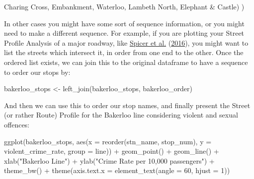 \documentclass[
  krantz2]{krantz}
\makeatletter
\newenvironment{Shaded}{\begin{snugshade}}{\end{snugshade}}
\newcommand{\AttributeTok}[1]{\textcolor[rgb]{0.61,0.61,0.61}{#1}}
\newcommand{\DecValTok}[1]{\textcolor[rgb]{0.06,0.06,0.06}{#1}}
\newcommand{\FunctionTok}[1]{\textcolor[rgb]{0,0,0}{#1}}
\newcommand{\NormalTok}[1]{#1}
\newcommand{\OtherTok}[1]{\textcolor[rgb]{0.37,0.37,0.37}{#1}}
\newcommand{\SpecialCharTok}[1]{\textcolor[rgb]{0,0,0}{#1}}
\newcommand{\StringTok}[1]{\textcolor[rgb]{0.5,0.5,0.5}{#1}}
\newenvironment{kframe}{%
\medskip{}
\setlength{\fboxsep}{.8em}
 \def\at@end@of@kframe{}%
 \ifinner\ifhmode%
  \def\at@end@of@kframe{\end{minipage}}%
  \begin{minipage}{\columnwidth}%
 \fi\fi%
 \def\FrameCommand##1{\hskip\@totalleftmargin \hskip-\fboxsep
 \colorbox{shadecolor}{##1}\hskip-\fboxsep
     \hskip-\linewidth \hskip-\@totalleftmargin \hskip\columnwidth}%
 \MakeFramed {\advance\hsize-\width
   \@totalleftmargin\z@ \linewidth\hsize
   \@setminipage}}%
 {\par\unskip\endMakeFramed%
 \at@end@of@kframe}
\renewenvironment{Shaded}{\begin{kframe}}{\end{kframe}}
\makeatother
\begin{document}
\begin{Shaded}
\begin{Highlighting}[]
                                           \StringTok{\textquotesingle{}Charing Cross\textquotesingle{}}\NormalTok{,}
                                           \StringTok{\textquotesingle{}Embankment\textquotesingle{}}\NormalTok{,}
                                           \StringTok{\textquotesingle{}Waterloo\textquotesingle{}}\NormalTok{,}
                                           \StringTok{\textquotesingle{}Lambeth North\textquotesingle{}}\NormalTok{,}
                                           \StringTok{\textquotesingle{}Elephant \& Castle\textquotesingle{}}\NormalTok{)}
\NormalTok{)}
\end{Highlighting}
\end{Shaded}

In other cases you might have some sort of sequence information, or you might need to make a different sequence. For example, if you are plotting your Street Profile Analysis of a major roadway, like \protect\hyperlink{ref-Spicer_2016}{Spicer et al.} (\protect\hyperlink{ref-Spicer_2016}{2016}), you might want to list the streets which intersect it, in order from one end to the other. Once the ordered list exists, we can join this to the original dataframe to have a sequence to order our stops by:

\begin{Shaded}
\begin{Highlighting}[]
\NormalTok{bakerloo\_stops }\OtherTok{\textless{}{-}} \FunctionTok{left\_join}\NormalTok{(bakerloo\_stops, bakerloo\_order)}
\end{Highlighting}
\end{Shaded}

And then we can use this to order our stop names, and finally present the Street (or rather Route) Profile for the Bakerloo line considering violent and sexual offences:

\begin{Shaded}
\begin{Highlighting}[]
\FunctionTok{ggplot}\NormalTok{(bakerloo\_stops, }
       \FunctionTok{aes}\NormalTok{(}\AttributeTok{x =} \FunctionTok{reorder}\NormalTok{(stn\_name, stop\_num), }
           \AttributeTok{y =}\NormalTok{ violent\_crime\_rate, }
           \AttributeTok{group =}\NormalTok{ line)) }\SpecialCharTok{+} 
  \FunctionTok{geom\_point}\NormalTok{() }\SpecialCharTok{+} 
  \FunctionTok{geom\_line}\NormalTok{() }\SpecialCharTok{+} 
  \FunctionTok{xlab}\NormalTok{(}\StringTok{"Bakerloo Line"}\NormalTok{) }\SpecialCharTok{+} 
  \FunctionTok{ylab}\NormalTok{(}\StringTok{"Crime Rate per 10,000 passengers"}\NormalTok{) }\SpecialCharTok{+} 
  \FunctionTok{theme\_bw}\NormalTok{() }\SpecialCharTok{+} 
  \FunctionTok{theme}\NormalTok{(}\AttributeTok{axis.text.x =} \FunctionTok{element\_text}\NormalTok{(}\AttributeTok{angle =} \DecValTok{60}\NormalTok{, }\AttributeTok{hjust =} \DecValTok{1}\NormalTok{))}
\end{Highlighting}
\end{Shaded}
\end{document}
